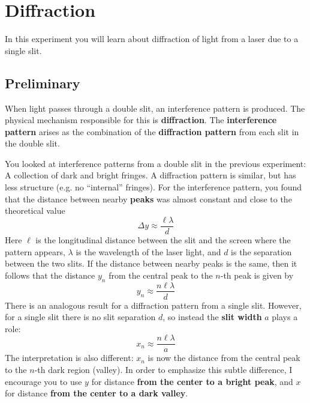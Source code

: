 \setcounter{chapter}{10}
\chapter{Diffraction}
%
In this experiment you will learn about diffraction of light from a laser due to a single slit.
%
\section{Preliminary}
%
When light passes through a double slit, an interference pattern is produced. The physical mechanism responsible for this is \textbf{diffraction}. The \textbf{interference pattern} arises as the combination of the \textbf{diffraction pattern} from each slit in the double slit.

You looked at interference patterns from a double slit in the previous experiment: A collection of dark and bright fringes. A diffraction pattern is similar, but has less structure (e.g. no ``internal'' fringes). For the interference pattern, you found that the distance between nearby \textbf{peaks} was almost constant and close to the theoretical value
\begin{equation}
    \Delta y \approx \frac{\ell \lambda}{d}
\end{equation}
Here $\ell$ is the longitudinal distance between the slit and the screen where the pattern appears, $\lambda$ is the wavelength of the laser light, and $d$ is the separation between the two slits. If the distance between nearby peaks is the same, then it follows that the distance $y_{n}$ from the central peak to the $n$-th peak is given by
\begin{equation}
    y_{n} \approx \frac{n \ell \lambda}{d}
\end{equation}
There is an analogous result for a diffraction pattern from a single slit. However, for a single slit there is no slit separation $d$, so instead the \textbf{slit width} $a$ plays a role:
\begin{equation}
    x_{n} \approx \frac{n \ell \lambda}{a}
\end{equation}
The interpretation is also different: $x_{n}$ is now the distance from the central peak to the $n$-th dark region (valley). In order to emphasize this subtle difference, I encourage you to use $y$ for distance \textbf{from the center to a bright peak}, and $x$ for distance \textbf{from the center to a dark valley}.
%
